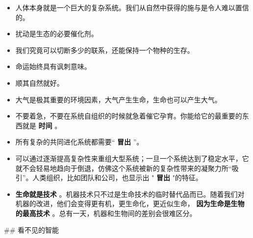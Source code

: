 \documentclass[11pt]{article}
\begin{document}
\begin{itemize}
\item 人体本身就是一个巨大的复杂系统。我们从自然中获得的施与是令人难以置信的。
\item 扰动是生态的必要催化剂。
\item 我们究竟可以切断多少的联系，还能保持一个物种的生存。
\item 命运始终具有讽刺意味。
\item 顺其自然就好。
\item 大气是极其重要的环境因素，大气产生生命，生命也可以产生大气。
\item 不要着急，不要在系统自组织的时候就急着催它孕育。你能给它的最重要的东西就是 \textbf{时间} 。
\item 所有复杂的共同进化系统都需要“ \textbf{冒出} ”。
\item 可以通过逐渐提高复杂性来重组大型系统；一旦一个系统达到了稳定水平，它就不会轻易地趋向于倒退，仿佛这个系统被新的复杂性带来的凝聚力所“吸引”。人类组织，比如团队和公司，也显示出 " \textbf{冒出} "的特征。
\item \textbf{生命就是技术} 。机器技术只不过是生命技术的临时替代品而已。随着我们对机器的改进，他们会变得更有机，更生命化，更近似生命， \textbf{因为生命是生物的最高技术} 。总有一天，机器和生物间的差别会很难区分。
\end{itemize}

\#\# 看不见的智能
\end{document}
